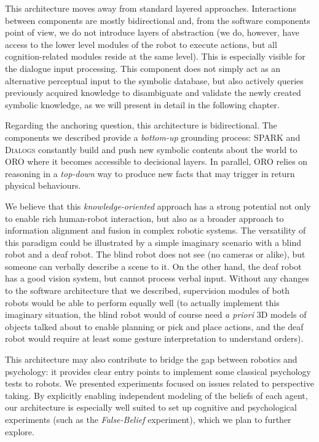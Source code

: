This architecture moves away from standard layered approaches. Interactions
between components are mostly bidirectional and, from the software components
point of view, we do not introduce layers of abstraction (we do, however, have
access to the lower level modules of the robot to execute actions, but all
cognition-related modules reside at the same level). This is especially visible
for the dialogue input processing. This component does not simply act as an
alternative perceptual input to the symbolic database, but also actively
queries previously acquired knowledge to disambiguate and validate the newly
created symbolic knowledge, as we will present in detail in the following
chapter.

Regarding the anchoring question, this architecture is bidirectional. The
components we described provide a \textit{bottom-up} grounding process: SPARK
and \textsc{Dialogs} constantly build and push new symbolic contents about the
world to ORO where it becomes accessible to decisional layers. In parallel, ORO
relies on reasoning in a \textit{top-down} way to produce new facts that may
trigger in return physical behaviours. 

We believe that this \emph{knowledge-oriented} approach has a strong potential
not only to enable rich human-robot interaction, but also as a broader approach
to information alignment and fusion in complex robotic systems.  The
versatility of this paradigm could be illustrated by a simple imaginary
scenario with a blind robot and a deaf robot. The blind robot does not see (no
cameras or alike), but someone can verbally describe a scene to it. On the
other hand, the deaf robot has a good vision system, but cannot process verbal
input.  Without any changes to the software architecture that we described,
supervision modules of both robots would be able to perform equally well (to
actually implement this imaginary situation, the blind robot would of course
need \textit{a priori} 3D models of objects talked about to enable planning or
pick and place actions, and the deaf robot would require at least some gesture
interpretation to understand orders).

This architecture may also contribute to bridge the gap between robotics and
psychology: it provides clear entry points to implement some classical
psychology tests to robots. We presented experiments focused on issues related
to perspective taking. By explicitly enabling independent modeling of the
beliefs of each agent, our architecture is especially well suited to set up
cognitive and psychological experiments (such as the \emph{False-Belief}
experiment), which we plan to further explore.


